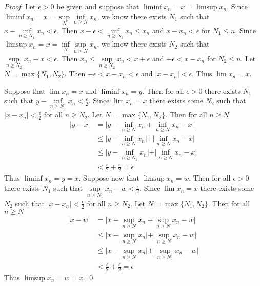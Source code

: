 \documentclass[12pt]{article}
\renewenvironment{proof}{\hspace{-4 ex} \emph{Proof}:}{\qed}
\begin{document}
	\begin{proof}
		Let $\epsilon >0$ be given and suppose that $\liminf{x_n} = x = \limsup{x_n}$. Since $\liminf{x_n} = x = \sup\limits_N \inf\limits_{n \geq N}x_n$, we know there exists $N_1$ such that \\$x - \inf\limits_{n \geq N_1} x_n < \epsilon$. Then $x - \epsilon < \inf\limits_{n \geq N_1} x_n \leq x_n$ and $x - x_n < \epsilon$ for $N_1 \leq n$. Since $\limsup{x_n} = x = \inf\limits_N \sup\limits_{n \geq N}x_n$, we know there exists $N_2$ such that \\$\sup\limits_{n \geq N_2} x_n - x < \epsilon$. Then $x_n \leq \sup\limits_{n \geq N_2}x_n < x + \epsilon$ and $-\epsilon < x - x_n$ for $N_2 \leq n$. Let $N = \max\{N_1,N_2\}$. Then $-\epsilon < x - x_n < \epsilon$ and $\vert x - x_n \vert < \epsilon$. Thus $\lim x_n = x$. \bigbreak
		
		Suppose that $\lim x_n = x$ and $\liminf x_n = y$. Then for all $\epsilon > 0$ there exists $N_1$ such that $y -  \inf\limits_{n \geq N_1}x_n < \tfrac{\epsilon}{2}$. Since $\lim x_n = x$ there exists some $N_2$ such that $\vert x - x_n \vert < \tfrac{\epsilon}{2}$ for all $n \geq N_2$. Let $N = \max\{N_1,N_2\}$. Then for all $n \geq N$
		\begin{align*}
			\vert y - x \vert & = \vert y - \inf\limits_{n \geq N}x_n + \inf\limits_{n \geq N}x_n - x \vert \\
			& \leq \vert y - \inf\limits_{n \geq N}x_n \vert + \vert \inf\limits_{n \geq N}x_n - x \vert \\
			& \leq \vert y - \inf\limits_{n \geq N_1}x_n \vert + \vert \inf\limits_{n \geq N}x_n - x \vert \\
			& < \tfrac{\epsilon}{2} + \tfrac{\epsilon}{2} = \epsilon
		\end{align*}
		Thus $\liminf x_n = y = x$. \bigbreak
		Suppose now that $\limsup x_n = w$. Then for all $\epsilon > 0$ there exists $N_1$ such that $\sup\limits_{n \geq N_1}x_n - w < \tfrac{\epsilon}{2}$. Since $\lim x_n = x$ there exists some $N_2$ such that $\vert x - x_n \vert < \tfrac{\epsilon}{2}$ for all $n \geq N_2$. Let $N = \max\{N_1,N_2\}$. Then for all $n \geq N$
		\begin{align*}
			\vert x - w \vert & = \vert x - \sup\limits_{n \geq N}x_n + \sup\limits_{n \geq N}x_n - w \vert \\
			& \leq \vert x - \sup\limits_{n \geq N}x_n \vert + \vert \sup\limits_{n \geq N}x_n - w \vert \\
			& \leq \vert x - \sup\limits_{n \geq N}x_n \vert + \vert \sup\limits_{n \geq N_1}x_n - w \vert \\
			& < \tfrac{\epsilon}{2} + \tfrac{\epsilon}{2} = \epsilon
		\end{align*}
		Thus $\limsup x_n = w = x$. \bigbreak
	\end{proof}
\end{document}
